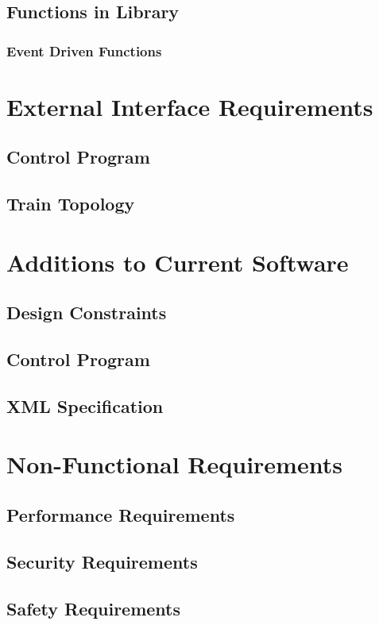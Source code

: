 \documentclass[a4paper,11pt,notitlepage]{article}
\begin{document}
\subsection{Functions in Library}
\subsubsection{Event Driven Functions}

\section{External Interface Requirements}
\subsection{Control Program}
\subsection{Train Topology}

\section{Additions to Current Software}
\subsection{Design Constraints}
\subsection{Control Program}
\subsection{XML Specification}

\section{Non-Functional Requirements}
\subsection{Performance Requirements}
\subsection{Security Requirements}
\subsection{Safety Requirements}
\end{document}
